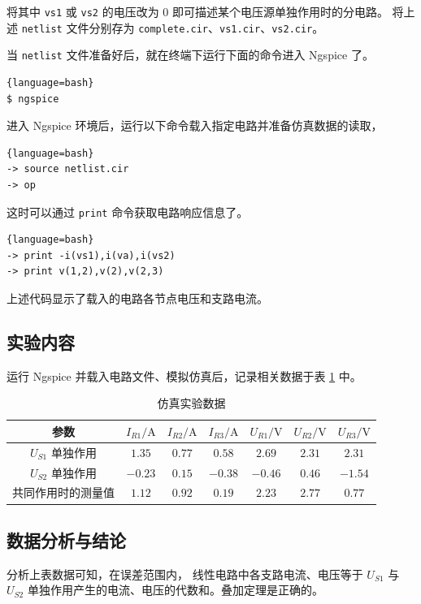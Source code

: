 \documentclass[UTF8,linespread=1.236]{ctexart}
\newcommand\pureunitA{\mathrm{A}}
\newcommand\pureunitV{\mathrm{V}}
\begin{document}
将其中 \verb|vs1| 或 \verb|vs2| 的电压改为 $0$ 即可描述某个电压源单独作用时的分电路。
将上述 \verb|netlist| 文件分别存为 \verb|complete.cir|、\verb|vs1.cir|、\verb|vs2.cir|。

当 \verb|netlist| 文件准备好后，就在终端下运行下面的命令进入 Ngspice 了。
\begin{lstlisting}{language=bash}
$ ngspice
\end{lstlisting}

进入 Ngspice 环境后，运行以下命令载入指定电路并准备仿真数据的读取，
\begin{lstlisting}{language=bash}
-> source netlist.cir
-> op
\end{lstlisting}

这时可以通过 \verb|print| 命令获取电路响应信息了。
\begin{lstlisting}{language=bash}
-> print -i(vs1),i(va),i(vs2)
-> print v(1,2),v(2),v(2,3)
\end{lstlisting}
上述代码显示了载入的电路各节点电压和支路电流。

\subsection{实验内容}

运行 Ngspice 并载入电路文件、模拟仿真后，记录相关数据于表 \ref{tab:expdata} 中。
\begin{table}[H]
\centering
\begin{tabular}{ccccccc}
\toprule
参数 & $I_{R1}/\pureunitA$ & $I_{R2}/\pureunitA$ & $I_{R3}/\pureunitA$ & $U_{R1}/\pureunitV$ & $U_{R2}/\pureunitV$ & $U_{R3}/\pureunitV$ \\
\midrule
$U_{S1}$ 单独作用 & $1.35$ & $0.77$ & $0.58$ & $2.69$ & $2.31$ & $2.31$ \\
$U_{S2}$ 单独作用 & $-0.23$ & $0.15$ & $-0.38$ & $-0.46$ & $0.46$ & $-1.54$ \\
共同作用时的测量值 & $1.12$ & $0.92$ & $0.19$ & $2.23$ & $2.77$ & $0.77$ \\
\bottomrule
\end{tabular}
\caption{仿真实验数据}\label{tab:expdata}
\end{table}


\subsection{数据分析与结论}

分析上表数据可知，在误差范围内，
线性电路中各支路电流、电压等于 $U_{S1}$ 与 $U_{S2}$ 单独作用产生的电流、电压的代数和。叠加定理是正确的。
\end{document}

